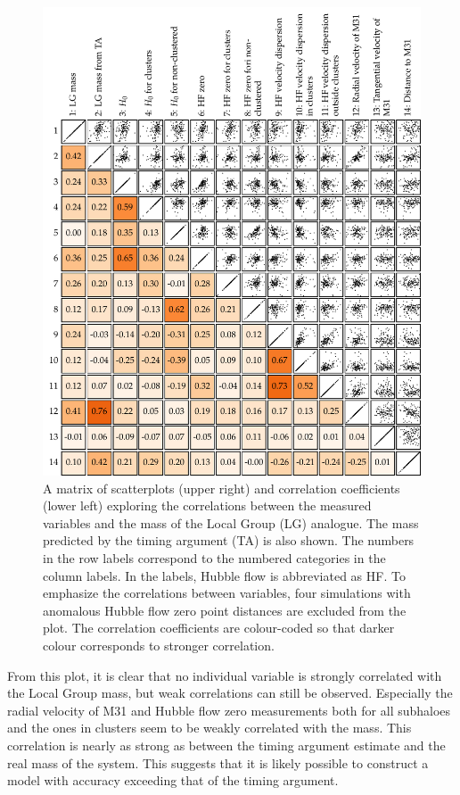 \documentclass[english, twoside]{HYgradu}
\begin{document}
\begin{figure}
    \centering
    \includegraphics{kuvat/PCA/scattermatrix-tightOutlierCriteria.pdf}
    \caption{A matrix of scatterplots (upper right) and correlation coefficients (lower left) exploring the correlations between the measured variables and the mass of the Local Group (LG) analogue. The mass predicted by the timing argument (TA) is also shown. The numbers in the row labels correspond to the numbered categories in the column labels. In the labels, Hubble flow is abbreviated as HF. To emphasize the correlations between variables, four simulations with anomalous Hubble flow zero point distances are excluded from the plot. The correlation coefficients are colour-coded so that darker colour corresponds to stronger correlation.}\label{fig:pca-scattermatrix}
\end{figure}

From this plot, it is clear that no individual variable is strongly correlated with the Local Group mass, but weak correlations can still be observed. Especially the radial velocity of M31 and Hubble flow zero measurements both for all subhaloes and the ones in clusters seem to be weakly correlated with the mass. This correlation is nearly as strong as between the timing argument estimate and the real mass of the system. This suggests that it is likely possible to construct a model with accuracy exceeding that of the timing argument.
\end{document}
